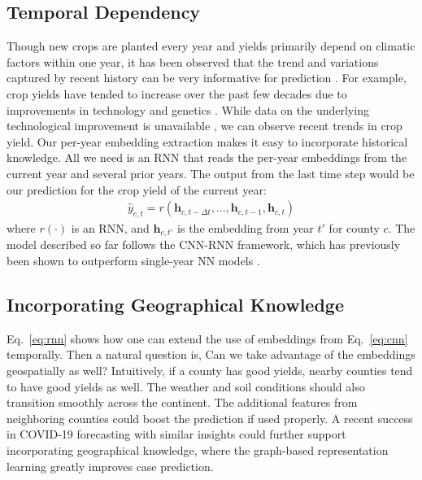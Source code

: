 \subsection{Temporal Dependency}
Though new crops are planted every year and yields primarily depend on climatic factors within one year, it has been observed that the trend and variations captured by recent history can be very informative for prediction \cite{khaki2020cnn}. For example, crop yields have tended to increase over the past few decades due to improvements in technology and genetics \cite{ortiz2018another}. While data on the underlying technological improvement is unavailable \cite{khaki2020cnn}, we can observe recent trends in crop yield. Our per-year embedding extraction makes it easy to incorporate  historical knowledge. All we need is an RNN that reads the per-year embeddings from the current year and several prior years. The output from the last time step would be our prediction for the crop yield of the current year: 
\begin{equation}
\label{eq:rnn}
\begin{aligned}
\widehat{y}_{c,t}=r(\mathbf{h}_{c,t-\Delta t}, ..., \mathbf{h}_{c,t-1}, \mathbf{h}_{c,t})
\end{aligned}
\end{equation}
where $r(\cdot)$ is an RNN, and $\mathbf{h}_{c,t'}$ is the embedding from year $t'$ for county $c$. The model described so far follows the CNN-RNN framework, which has previously been shown to outperform single-year NN models \cite{khaki2020cnn}.


\subsection{Incorporating Geographical Knowledge}
Eq.~\ref{eq:rnn} shows how one can extend the use of embeddings from Eq.~\ref{eq:cnn} temporally. Then a natural question is, Can we take advantage of the embeddings geospatially as well? Intuitively, if a county has good yields, nearby counties tend to have good yields as well. The weather and soil conditions should also transition smoothly across the continent. The additional features from neighboring counties could boost the prediction if used properly. A recent success in COVID-19 forecasting \cite{kapoor2020examining} with similar insights could further support incorporating geographical knowledge, where the graph-based representation learning greatly improves case prediction. 

